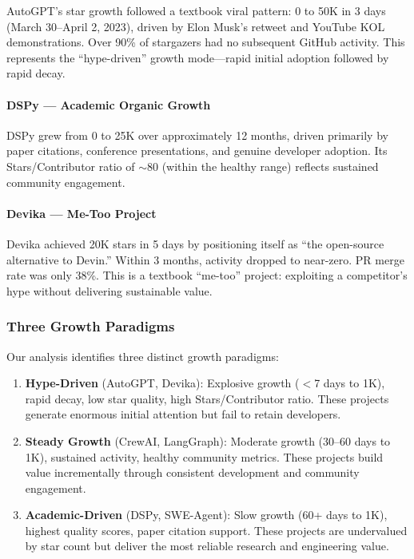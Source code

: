 AutoGPT's star growth followed a textbook viral pattern: 0 to 50K in 3 days (March 30--April 2, 2023), driven by Elon Musk's retweet and YouTube KOL demonstrations. Over 90\% of stargazers had no subsequent GitHub activity. This represents the ``hype-driven'' growth mode---rapid initial adoption followed by rapid decay.

\paragraph{DSPy --- Academic Organic Growth}

DSPy grew from 0 to 25K over approximately 12 months, driven primarily by paper citations, conference presentations, and genuine developer adoption. Its Stars/Contributor ratio of $\sim$80 (within the healthy range) reflects sustained community engagement.

\paragraph{Devika --- Me-Too Project}

Devika achieved 20K stars in 5 days by positioning itself as ``the open-source alternative to Devin.'' Within 3 months, activity dropped to near-zero. PR merge rate was only 38\%. This is a textbook ``me-too'' project: exploiting a competitor's hype without delivering sustainable value.

\subsubsection{Three Growth Paradigms}

Our analysis identifies three distinct growth paradigms:

\begin{enumerate}
\item \textbf{Hype-Driven} (AutoGPT, Devika): Explosive growth ($<$7 days to 1K), rapid decay, low star quality, high Stars/Contributor ratio. These projects generate enormous initial attention but fail to retain developers.

\item \textbf{Steady Growth} (CrewAI, LangGraph): Moderate growth (30--60 days to 1K), sustained activity, healthy community metrics. These projects build value incrementally through consistent development and community engagement.

\item \textbf{Academic-Driven} (DSPy, SWE-Agent): Slow growth (60+ days to 1K), highest quality scores, paper citation support. These projects are undervalued by star count but deliver the most reliable research and engineering value.
\end{enumerate}

